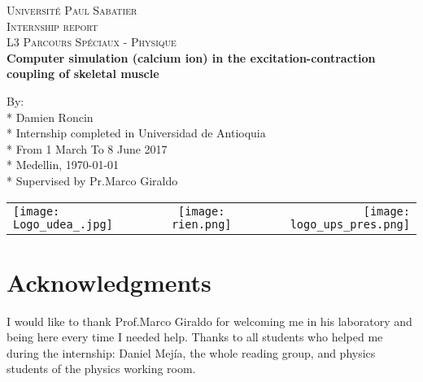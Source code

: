 \documentclass[a4paper,11pt]{report}
\begin{document}
\renewcommand\contentsname{Table of Contents}
\renewcommand\bibname{References }
\renewcommand*\chaptername{Part}
\renewcommand\appendixname{Appendix}
\begin{titlepage}
\center

\vspace{2cm}

\textsc{\LARGE Université Paul Sabatier}\\[1cm] 
\textsc{\Large Internship report}\\
\textsc{\Large L3 Parcours Spéciaux - Physique}\\[2cm] 


{\LARGE \bfseries Computer simulation (calcium ion) in the excitation-contraction coupling of skeletal muscle} \\[0.2cm] 
\vspace{1.5cm}
 
\large By: \\*
\vspace{0.1cm}
Damien Roncin \\* 
\vspace{0.1cm}
Internship completed in Universidad de Antioquia \\* 
\vspace{0.1cm}
From 1 March To 8 June 2017 \\* 
\vspace{0.1cm}
Medellin, \today \\*
\vspace{0.1cm}
Supervised by Pr.Marco Giraldo \\[5.5cm] 
\vspace{4cm}
\begin{tabular}{l c r}
   \texttt{[image: Logo\_udea\_.jpg]} &  \texttt{[image: rien.png]} &
   \texttt{[image: logo\_ups\_pres.png]} 
\end{tabular}
\end{titlepage}

\newpage

\section*{Acknowledgments}
\thispagestyle{empty}
\setcounter{page}{0}

I would like to thank Prof.Marco Giraldo for welcoming me in his laboratory and being here every time I needed help. Thanks to all students who helped me during the internship: Daniel Mejía, the whole reading group, and physics students of the physics working room.
\end{document}
